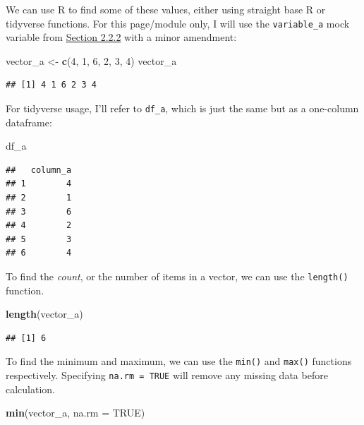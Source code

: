 \documentclass[
]{book}
\newenvironment{Shaded}{\begin{snugshade}}{\end{snugshade}}
\newcommand{\AttributeTok}[1]{\textcolor[rgb]{0.13,0.29,0.53}{#1}}
\newcommand{\ConstantTok}[1]{\textcolor[rgb]{0.56,0.35,0.01}{#1}}
\newcommand{\DecValTok}[1]{\textcolor[rgb]{0.00,0.00,0.81}{#1}}
\newcommand{\FunctionTok}[1]{\textcolor[rgb]{0.13,0.29,0.53}{\textbf{#1}}}
\newcommand{\NormalTok}[1]{#1}
\newcommand{\OtherTok}[1]{\textcolor[rgb]{0.56,0.35,0.01}{#1}}
\begin{document}
We can use R to find some of these values, either using straight base R or tidyverse functions. For this page/module only, I will use the \texttt{variable\_a} mock variable from \hyperref[vectors]{Section 2.2.2} with a minor amendment:

\begin{Shaded}
\begin{Highlighting}[]
\NormalTok{vector\_a }\OtherTok{\textless{}{-}} \FunctionTok{c}\NormalTok{(}\DecValTok{4}\NormalTok{, }\DecValTok{1}\NormalTok{, }\DecValTok{6}\NormalTok{, }\DecValTok{2}\NormalTok{, }\DecValTok{3}\NormalTok{, }\DecValTok{4}\NormalTok{)}
\NormalTok{vector\_a}
\end{Highlighting}
\end{Shaded}

\begin{verbatim}
## [1] 4 1 6 2 3 4
\end{verbatim}

For tidyverse usage, I'll refer to \texttt{df\_a}, which is just the same but as a one-column dataframe:

\begin{Shaded}
\begin{Highlighting}[]
\NormalTok{df\_a}
\end{Highlighting}
\end{Shaded}

\begin{verbatim}
##   column_a
## 1        4
## 2        1
## 3        6
## 4        2
## 5        3
## 6        4
\end{verbatim}

To find the \emph{count}, or the number of items in a vector, we can use the \texttt{length()} function.

\begin{Shaded}
\begin{Highlighting}[]
\FunctionTok{length}\NormalTok{(vector\_a)}
\end{Highlighting}
\end{Shaded}

\begin{verbatim}
## [1] 6
\end{verbatim}

To find the minimum and maximum, we can use the \texttt{min()} and \texttt{max()} functions respectively. Specifying \texttt{na.rm\ =\ TRUE} will remove any missing data before calculation.

\begin{Shaded}
\begin{Highlighting}[]
\FunctionTok{min}\NormalTok{(vector\_a, }\AttributeTok{na.rm =} \ConstantTok{TRUE}\NormalTok{)}
\end{Highlighting}
\end{Shaded}
\end{document}
